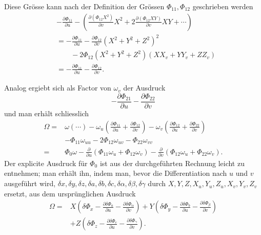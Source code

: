 \documentclass[11pt,a4paper,leqno]{article}
\begin{document}
Diese Grösse kann nach der Definition der Grössen $\Phi_{11},\Phi_{12}$
geschrieben werden
\[
\begin{aligned}
&-\frac{\partial\Phi_{11}}{\partial u}
-\left(\frac{\partial(\Phi_{12}X^2)}{\partial v}X^2
+2\frac{\partial(\Phi_{12}XY)}{\partial v}XY+\cdots\right)\\
&=-\frac{\partial\Phi_{11}}{\partial u}
-\frac{\partial\Phi_{12}}{\partial v}(X^2+Y^2+Z^2)^2\\
&\qquad-2\Phi_{12}(X^2+Y^2+Z^2)(XX_v+YY_v+ZZ_v)\\
&=-\frac{\partial\Phi_{11}}{\partial u}
-\frac{\partial\Phi_{12}}{\partial v}.
\end{aligned}
\]

Analog ergiebt sich als Factor von $\omega_v$ der Ausdruck
\[
-\frac{\partial\Phi_{21}}{\partial u}
-\frac{\partial\Phi_{22}}{\partial v}
\]
und man erhält schliesslich
\begin{equation}\tag{29}
\begin{aligned}
\Omega={}&\omega(\cdots)
-\omega_u\left(\frac{\partial\Phi_{11}}{\partial u}
+\frac{\partial\Phi_{12}}{\partial v}\right)
-\omega_v\left(\frac{\partial\Phi_{12}}{\partial u}
+\frac{\partial\Phi_{22}}{\partial v}\right)\\
&-\Phi_{11}\omega_{uu}-2\Phi_{12}\omega_{uv}-\Phi_{22}\omega_{vv}\\
={}&\Phi_0\omega
-\frac{\partial}{\partial u}(\Phi_{11}\omega_u+\Phi_{12}\omega_v)
-\frac{\partial}{\partial v}(\Phi_{12}\omega_u+\Phi_{22}\omega_v).
\end{aligned}
\end{equation}
Der explicite Ausdruck für $\Phi_0$ ist aus der durchgeführten Rechnung
leicht zu entnehmen; man erhält ihn, indem man, bevor die Differentiation
nach $u$ und $v$ ausgeführt wird, $\delta x,\delta y,\delta z,\delta a,
\delta b,\delta c,\delta\alpha,\delta\beta,\delta\gamma$ durch
$X,Y,Z,X_u,Y_u,Z_u,X_v,Y_v,Z_v$ ersetzt, aus dem ursprünglichen Ausdruck
\[
\begin{aligned}
\Omega={}&X\left(\delta\Phi_x
-\frac{\partial\delta\Phi_a}{\partial u}
-\frac{\partial\delta\Phi_\alpha}{\partial v}\right)
+Y\left(\delta\Phi_y
-\frac{\partial\delta\Phi_b}{\partial u}
-\frac{\partial\delta\Phi_\beta}{\partial v}\right)\\
&+Z\left(\delta\Phi_z
-\frac{\partial\delta\Phi_c}{\partial u}
-\frac{\partial\delta\Phi_\gamma}{\partial v}\right).
\end{aligned}
\]
\end{document}
